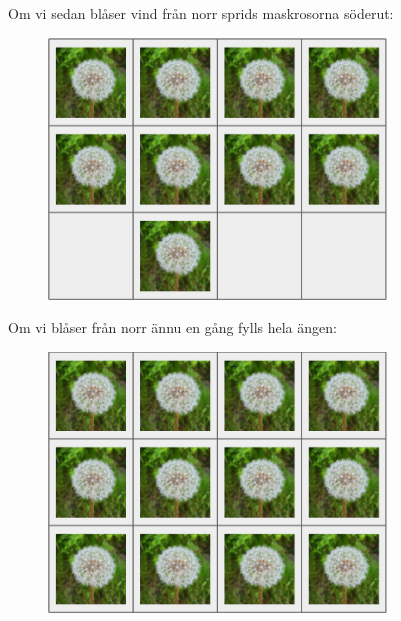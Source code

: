 Om vi sedan blåser vind från norr sprids maskrosorna söderut:
\begin{centering}
  \begin{figure}[h]
      \centering
      \includegraphics[width=0.8\textwidth]{t2.png}
  \end{figure}
\end{centering}
Om vi blåser från norr ännu en gång fylls hela ängen:
\begin{centering}
  \begin{figure}[h]
      \centering
      \includegraphics[width=0.8\textwidth]{t3.png}
  \end{figure}
\end{centering}
